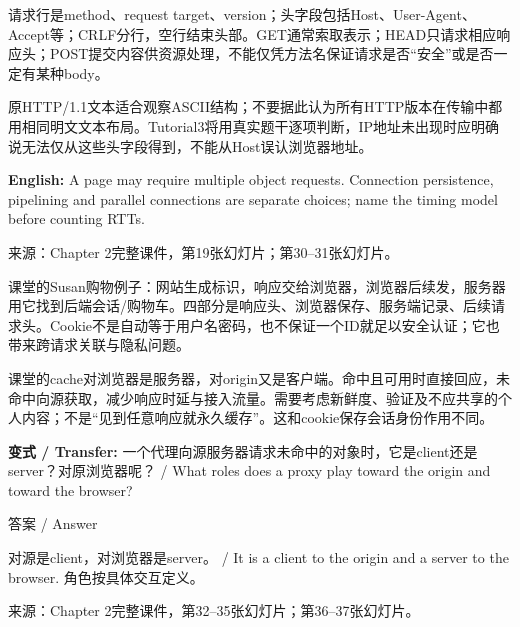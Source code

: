 

请求行是method、request target、version；头字段包括Host、User-Agent、Accept等；CRLF分行，空行结束头部。GET通常索取表示；HEAD只请求相应响应头；POST提交内容供资源处理，不能仅凭方法名保证请求是否“安全”或是否一定有某种body。




原HTTP/1.1文本适合观察ASCII结构；不要据此认为所有HTTP版本在传输中都用相同明文文本布局。Tutorial3将用真实题干逐项判断，IP地址未出现时应明确说无法仅从这些头字段得到，不能从Host误认浏览器地址。


\textbf{English:} A page may require multiple object requests. Connection persistence, pipelining and parallel connections are separate choices; name the timing model before counting RTTs.


来源：Chapter 2完整课件，第19张幻灯片；第30–31张幻灯片。





课堂的Susan购物例子：网站生成标识，响应交给浏览器，浏览器后续发，服务器用它找到后端会话/购物车。四部分是响应头、浏览器保存、服务端记录、后续请求头。Cookie不是自动等于用户名密码，也不保证一个ID就足以安全认证；它也带来跨请求关联与隐私问题。


课堂的cache对浏览器是服务器，对origin又是客户端。命中且可用时直接回应，未命中向源获取，减少响应时延与接入流量。需要考虑新鲜度、验证及不应共享的个人内容；不是“见到任意响应就永久缓存”。这和cookie保存会话身份作用不同。


\textbf{变式 / Transfer:} 一个代理向源服务器请求未命中的对象时，它是client还是server？对原浏览器呢？ / What roles does a proxy play toward the origin and toward the browser?



\begin{StudySolution}{答案 / Answer}


对源是client，对浏览器是server。 / It is a client to the origin and a server to the browser. 角色按具体交互定义。


\end{StudySolution}


来源：Chapter 2完整课件，第32–35张幻灯片；第36–37张幻灯片。






